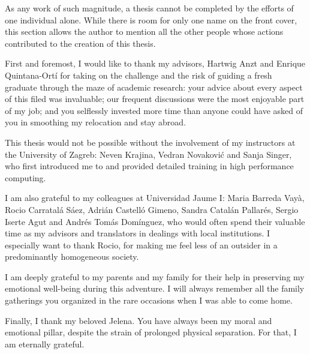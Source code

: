 As any work of such magnitude, a thesis cannot be completed by the efforts of
one individual alone. While there is room for only one name on the front cover,
this section allows the author to mention all the other people whose actions
contributed to the creation of this thesis.

First and foremost, I would like to thank my advisors, Hartwig Anzt and Enrique
Quintana-Ort\'{i} for taking on the challenge and the risk of guiding a fresh
graduate through the maze of academic research: your advice about every aspect
of this filed was invaluable; our frequent discussions were the most enjoyable
part of my job; and you selflessly invested more time than anyone could have
asked of you in smoothing my relocation and stay abroad.

This thesis would not be possible without the involvement of my instructors at
the University of Zagreb: Neven Krajina, Vedran Novakovi\'{c} and Sanja Singer,
who first introduced me to and provided detailed training in high performance
computing.

I am also grateful to my colleagues at Universidad Jaume I: Maria Barreda
Vay\`{a}, Rocio Carratal\'{a} S\'{a}ez, Adri\'{a}n Castell\'{o} Gimeno, Sandra
Catal\'{a}n Pallar\'{e}s, Sergio Iserte Agut and Andr\'{e}s Tom\'{a}s
Dom\'{i}nguez, who would often spend their valuable time as my advisors and
translators in dealings with local institutions. I especially want to thank
Rocio, for making me feel less of an outsider in a predominantly homogeneous
society.

I am deeply grateful to my parents and my family for their help in preserving my
emotional well-being during this adventure. I will always remember all the
family gatherings you organized in the rare occasions when I was able to come
home.

Finally, I thank my beloved Jelena. You have always been my moral and emotional
pillar, despite the strain of prolonged physical separation. For that, I am
eternally grateful.
